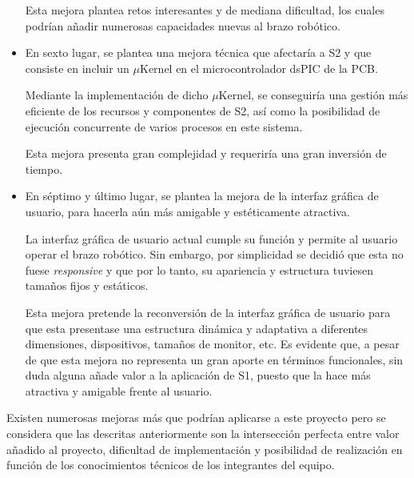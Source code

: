 \begin{itemize}
    Esta mejora plantea retos interesantes y de mediana dificultad, los cuales podrían añadir numerosas capacidades nuevas al brazo robótico.
    
    \item En sexto lugar, se plantea una mejora técnica que afectaría a \ac{S2} y que consiste en incluir un $\mu$Kernel en el microcontrolador dsPIC de la PCB.
    
    Mediante la implementación de dicho $\mu$Kernel, se conseguiría una gestión más eficiente de los recursos y componentes de \ac{S2}, así como la posibilidad de ejecución concurrente de varios procesos en este sistema.
    
    Esta mejora presenta gran complejidad y requeriría una gran inversión de tiempo.
    
    \item En séptimo y último lugar, se plantea la mejora de la interfaz gráfica de usuario, para hacerla aún más amigable y estéticamente atractiva.
    
    La interfaz gráfica de usuario actual cumple su función y permite al usuario operar el brazo robótico. Sin embargo, por simplicidad se decidió que esta no fuese \textit{responsive} y que por lo tanto, su apariencia y estructura tuviesen tamaños fijos y estáticos.
    
    Esta mejora pretende la reconversión de la interfaz gráfica de usuario para que esta presentase una estructura dinámica y adaptativa a diferentes dimensiones, dispositivos, tamaños de monitor, etc. Es evidente que, a pesar de que esta mejora no representa un gran aporte en términos funcionales, sin duda alguna añade valor a la aplicación de \ac{S1}, puesto que la hace más atractiva y amigable frente al usuario.
\end{itemize}

Existen numerosas mejoras más que podrían aplicarse a este proyecto pero se considera que las descritas anteriormente son la intersección perfecta entre valor añadido al proyecto, dificultad de implementación y posibilidad de realización en función de los conocimientos técnicos de los integrantes del equipo.